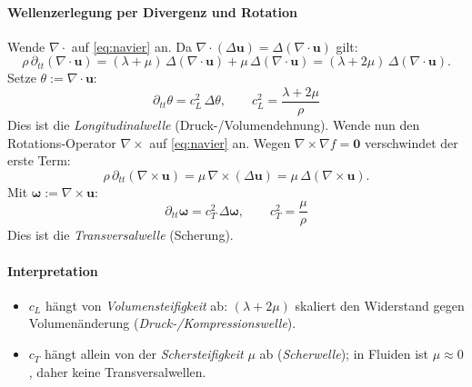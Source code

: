 \paragraph{Wellenzerlegung per Divergenz und Rotation}
Wende $\nabla\!\cdot$ auf \eqref{eq:navier} an.
Da $\nabla\!\cdot(\Delta\mathbf{u})=\Delta(\nabla\!\cdot\!\mathbf{u})$ gilt:
\[
    \rho\,\partial_{tt}(\nabla\!\cdot\!\mathbf{u})
    = (\lambda+\mu)\,\Delta(\nabla\!\cdot\!\mathbf{u}) + \mu\,\Delta(\nabla\!\cdot\!\mathbf{u})
    = (\lambda+2\mu)\,\Delta(\nabla\!\cdot\!\mathbf{u}).
\]
Setze $\theta := \nabla\!\cdot\!\mathbf{u}$:
\begin{equation}
    \boxed{\,\partial_{tt}\theta = c_L^2\,\Delta\theta,\qquad c_L^2=\frac{\lambda+2\mu}{\rho}\,}
    \label{eq:longitudinal}
\end{equation}
Dies ist die \emph{Longitudinalwelle} (Druck-/Volumendehnung).
Wende nun den Rotations-Operator $\nabla\times$ auf \eqref{eq:navier} an.
Wegen $\nabla\times\nabla f=\mathbf{0}$ verschwindet der erste Term:
\[
    \rho\,\partial_{tt}(\nabla\times\mathbf{u}) = \mu\,\nabla\times(\Delta\mathbf{u})
    = \mu\,\Delta(\nabla\times\mathbf{u}).
\]
Mit $\boldsymbol{\omega}:=\nabla\times\mathbf{u}$:
\begin{equation}
    \boxed{\,\partial_{tt}\boldsymbol{\omega} = c_T^2\,\Delta\boldsymbol{\omega},\qquad c_T^2=\frac{\mu}{\rho}\,}
    \label{eq:transversal}
\end{equation}
Dies ist die \emph{Transversalwelle} (Scherung).

\paragraph{Interpretation}
\begin{itemize}
  \item $c_L$ hängt von \emph{Volumensteifigkeit} ab: $(\lambda+2\mu)$ skaliert den Widerstand gegen Volumenänderung (\emph{Druck-/Kompressionswelle}).
  \item $c_T$ hängt allein von der \emph{Schersteifigkeit} $\mu$ ab (\emph{Scherwelle}); in Fluiden ist $\mu\approx 0$, daher keine Transversalwellen.
\end{itemize}

